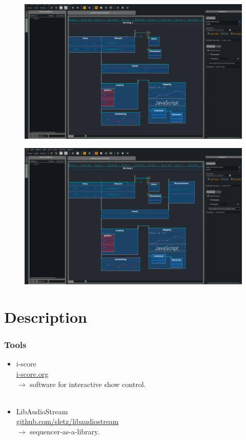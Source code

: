 \documentclass[draft]{beamer}
\begin{document}
\begin{frame} 
    \Large
    \begin{figure}
        \centering
        \includegraphics[width=\textwidth]{images/screens/13.png}
    \end{figure}
\end{frame}
\begin{frame} 
    \Large
    \begin{figure}
        \centering
        \includegraphics[width=\textwidth]{images/screens/14.png}
    \end{figure}
\end{frame}

\section{Description}

\begin{frame}	
    \frametitle{Tools}    
    \Large
    \begin{itemize}
        \item i-score~\\ \url{i-score.org}~\\$\rightarrow$ software for interactive show control.~\\~\\
        \item LibAudioStream\\ \url{github.com/sletz/libaudiostream}~\\$\rightarrow$ sequencer-as-a-library.
    \end{itemize}    
\end{frame}
\end{document}
